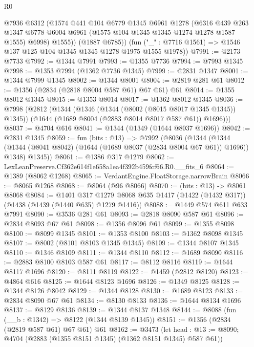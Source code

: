 \begin{lexlean}{R0}
\begin{coremodule}
          @7936
          @6312
          (@1574
            @441
            @104
            @6779
            @1345
            @6961
            @1278
            (@6316
              @439
              @263
              @1347
              @6778
              @6004
              @6961
              (@1575 @104 @1345 @1345 @1274 @1278 @1587 @1555)
              @6998)
            @1555))
        (@1887 @6785))
      (fun ("_" : @7716 @1561) => @1546 @137 @125 @104 @1345 @1345 @1278 @1975 @1555 @1978))
@7991 := @2173 @7733
@7992 := @1344 @7991
@7993 := @1355 @7736
@7994 := @7993 @1345
@7998 := @1353 @7994 (@1362 @7736 @1345)
@7999 := @2831 @1347
@8001 := @1344 @7999 @1345
@8002 := @1344 @8001
@8004 := @2819 @281 @61
@8012 := @1356 (@2834 (@2818 @8004 @587 @61) @67 @61) @61
@8014 := @1355 @8012 @1345
@8015 := @1353 @8014
@8017 := @1362 @8012 @1345
@8036 := @7998
    (@2812
      (@1344
        (@1346 (@1344 (@8002 (@8015 @8017 @1345 @1345)) @1345))
        (@1644 (@1689 @8004 (@2883 @8014 @8017 @587 @61)) @1696)))
@8037 := @4704 @616
@8041 := @1344 (@1349 (@1644 @8037 @1696))
@8042 := @2831 @1345
@8059 := fun (bits : @13) =>
  @7992
    (@8036
      (@1344
        (@1344 (@1344 (@8041 @8042) (@1644 (@1689 @8037 (@2834 @8004 @67 @61)) @1696)) @1348)
        @1345))
@8061 := @1386 @317 @1279
@8062 := LexLeanPreserve.Cf362e614f1e658a1ea4f392b459fcf66.R0.__fits_6
@8064 := @1389 (@8062 @1268)
@8065 := VerdantEngine.FloatStorage.narrowBrain
@8066 := @8065 @1268
@8068 := @8064 (@96 @8066)
@8070 := (bits : @13) -> @8061 @8068
@8084 := @1401
    @317
    @1279
    @8068
    @635
    @1417
    (@1422 (@1432 @317))
    (@1438 (@1439 (@1440 @635) @1279 @1416))
@8088 := @1449 @574 @611 @633 @7991
@8090 := @3536 @281 @61
@8093 := @2818 @8090 @587 @61
@8096 := @2834 @8093 @67 @61
@8098 := @1356 @8096 @61
@8099 := @1355 @8098
@8100 := @8099 @1345
@8101 := @1353 @8100
@8103 := @1362 @8098 @1345
@8107 := @8002 (@8101 @8103 @1345 @1345)
@8109 := @1344 @8107 @1345
@8110 := @1346 @8109
@8111 := @1344 @8110
@8112 := @1689 @8090
@8116 := @2883 @8100 @8103 @587 @61
@8117 := @8112 @8116
@8119 := @1644 @8117 @1696
@8120 := @8111 @8119
@8122 := @1459 (@2812 @8120)
@8123 := @4864 @616
@8125 := @1644 @8123 @1696
@8126 := @1349 @8125
@8128 := @1344 @8126 @8042
@8129 := @1344 @8128
@8130 := @1689 @8123
@8133 := @2834 @8090 @67 @61
@8134 := @8130 @8133
@8136 := @1644 @8134 @1696
@8137 := @8129 @8136
@8139 := @1344 @8137 @1348
@8144 := @8088 (fun (__b : @1342) => @8122 (@1344 @8139 @1345))
@8151 := @1356 (@2834 (@2819 @587 @61) @67 @61) @61
@8162 := @3473
    (let head : @13 := @8090; @4704 (@2883 (@1355 @8151 @1345) (@1362 @8151 @1345) @587 @61))

\end{coremodule}
\end{lexlean}
